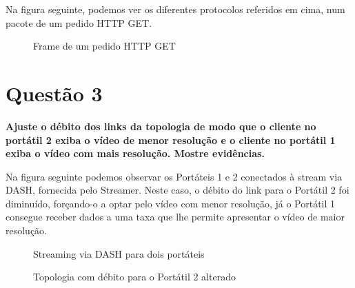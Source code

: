 \documentclass[a4paper, 11pt]{article}
\begin{document}
Na figura seguinte, podemos ver os diferentes protocolos referidos em cima, num pacote de um pedido HTTP GET.

\begin{figure}[H]
    \centering
    \caption{Frame de um pedido HTTP GET}
\end{figure}


\section{Questão 3}
\textbf{Ajuste o débito dos links da topologia de modo que o cliente no portátil 2 exiba o vídeo de menor resolução e o cliente
no portátil 1 exiba o vídeo com mais resolução. Mostre evidências.}
\vspace{0.25cm}

Na figura seguinte podemos observar os Portáteis 1 e 2 conectados à stream via DASH, fornecida pelo Streamer. Neste caso, o débito do link para o Portátil 2 foi diminuído, forçando-o a optar pelo vídeo com menor resolução, já o Portátil 1 consegue receber dados a uma taxa que lhe permite apresentar o vídeo de maior resolução.

\begin{figure}[H]
    \centering
    \caption{Streaming via DASH para dois portáteis}
\end{figure}

\begin{figure}[H]
    \centering
    \caption{Topologia com débito para o Portátil 2 alterado}
\end{figure}
\end{document}
